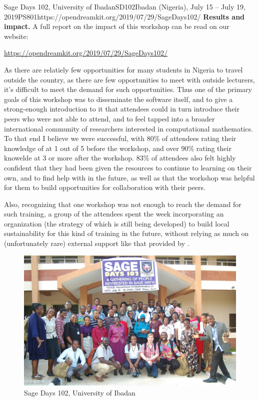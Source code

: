 \begin{event}{Sage Days 102, University of Ibadan}{SD102}{Ibadan (Nigeria), July 15 -- July 19, 2019}{PS}{80}{1}{https://opendreamkit.org/2019/07/29/SageDays102/}
\textbf{Results and impact.} A full report on the impact of this
workshop can be read on our website:
\centerline{\url{https://opendreamkit.org/2019/07/29/SageDays102/}}

As there are relatiely few opportunities for many students in Nigeria to travel
outside the country, as there are few opportunities to meet with
outside lecturers, it's difficult to meet the demand for such
opportunities. Thus one of the primary goals of this workshop was to
disseminate the software itself, and to give a strong-enough
introduction to it that attendees could in turn introduce their peers
who were not able to attend, and to feel tapped into a broader
international community of researchers interested in computational
mathematics. To that end I believe we were successful, with 80\% of
attendees rating their knowledge of \Sage at 1 out of 5 before the
workshop, and over 90\% rating their knowelde at 3 or more after the
workshop.  83\% of attendees also felt highly confident that they had
been given the resources to continue to learning on their own, and to
find help with \Sage in the future, as well as that the workshop was
helpful for them to build opportunities for collaboration with their
peers.

Also, recognizing that one workshop was not enough to reach the demand for such
training, a group of the attendees spent the week incorporating an
organization (the strategy of which is still being developed) to build
local sustainability for this kind of training in the future, without
relying as much on (unfortunately rare) external support like that provided
by \ODK.


\begin{figure}[ht]
\includegraphics[scale=.5]{days102_group.jpg}
\caption*{Sage Days 102, University of Ibadan}
\end{figure}



\end{event}
